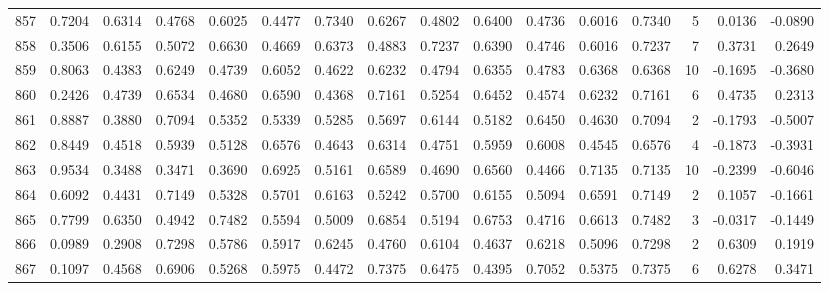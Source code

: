 \begin{tabular}{lrrrrrrrrrrrrrrr}
857 &      0.7204 &  0.6314 &  0.4768 &  0.6025 &  0.4477 &  0.7340 &  0.6267 &  0.4802 &  0.6400 &  0.4736 &   0.6016 &     0.7340 &      5 &                    0.0136 &                    -0.0890 \\
858 &      0.3506 &  0.6155 &  0.5072 &  0.6630 &  0.4669 &  0.6373 &  0.4883 &  0.7237 &  0.6390 &  0.4746 &   0.6016 &     0.7237 &      7 &                    0.3731 &                     0.2649 \\
859 &      0.8063 &  0.4383 &  0.6249 &  0.4739 &  0.6052 &  0.4622 &  0.6232 &  0.4794 &  0.6355 &  0.4783 &   0.6368 &     0.6368 &     10 &                   -0.1695 &                    -0.3680 \\
860 &      0.2426 &  0.4739 &  0.6534 &  0.4680 &  0.6590 &  0.4368 &  0.7161 &  0.5254 &  0.6452 &  0.4574 &   0.6232 &     0.7161 &      6 &                    0.4735 &                     0.2313 \\
861 &      0.8887 &  0.3880 &  0.7094 &  0.5352 &  0.5339 &  0.5285 &  0.5697 &  0.6144 &  0.5182 &  0.6450 &   0.4630 &     0.7094 &      2 &                   -0.1793 &                    -0.5007 \\
862 &      0.8449 &  0.4518 &  0.5939 &  0.5128 &  0.6576 &  0.4643 &  0.6314 &  0.4751 &  0.5959 &  0.6008 &   0.4545 &     0.6576 &      4 &                   -0.1873 &                    -0.3931 \\
863 &      0.9534 &  0.3488 &  0.3471 &  0.3690 &  0.6925 &  0.5161 &  0.6589 &  0.4690 &  0.6560 &  0.4466 &   0.7135 &     0.7135 &     10 &                   -0.2399 &                    -0.6046 \\
864 &      0.6092 &  0.4431 &  0.7149 &  0.5328 &  0.5701 &  0.6163 &  0.5242 &  0.5700 &  0.6155 &  0.5094 &   0.6591 &     0.7149 &      2 &                    0.1057 &                    -0.1661 \\
865 &      0.7799 &  0.6350 &  0.4942 &  0.7482 &  0.5594 &  0.5009 &  0.6854 &  0.5194 &  0.6753 &  0.4716 &   0.6613 &     0.7482 &      3 &                   -0.0317 &                    -0.1449 \\
866 &      0.0989 &  0.2908 &  0.7298 &  0.5786 &  0.5917 &  0.6245 &  0.4760 &  0.6104 &  0.4637 &  0.6218 &   0.5096 &     0.7298 &      2 &                    0.6309 &                     0.1919 \\
867 &      0.1097 &  0.4568 &  0.6906 &  0.5268 &  0.5975 &  0.4472 &  0.7375 &  0.6475 &  0.4395 &  0.7052 &   0.5375 &     0.7375 &      6 &                    0.6278 &                     0.3471 \\

\end{tabular}
